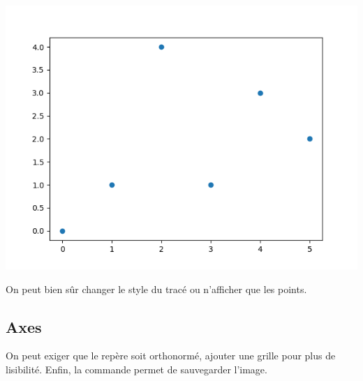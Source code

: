 \documentclass[11pt,class=report,crop=false]{standalone}
\begin{document}
\begin{minipage}{0.32\textwidth}
\begin{center}
\includegraphics[scale=\myscale,scale=0.35]{figures/pythonx-plot3}
\footnotesize {}
\end{center}
\end{minipage}

\bigskip

On peut bien sûr changer le style du tracé ou n'afficher que les points.


\subsection{Axes}

On peut exiger que le repère soit orthonormé, ajouter une grille pour plus de lisibilité.
Enfin, la commande  permet de sauvegarder l'image.
\end{document}
